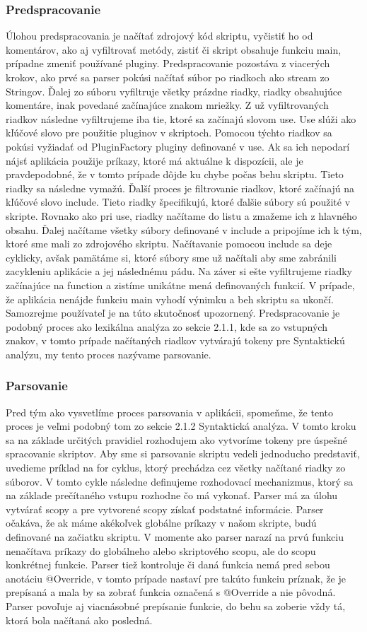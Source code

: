 {\subsubsection{Predspracovanie}
\indent Úlohou predspracovania je načítať zdrojový kód skriptu, vyčistiť ho od komentárov, ako aj vyfiltrovať metódy, zistiť či skript obsahuje funkciu main, prípadne zmeniť používané pluginy. Predspracovanie pozostáva z viacerých krokov, ako prvé sa parser pokúsi načítať súbor po riadkoch ako stream zo Stringov. Ďalej zo súboru vyfiltruje všetky prázdne riadky, riadky obsahujúce komentáre, inak povedané začínajúce znakom mriežky. Z už vyfiltrovaných riadkov následne vyfiltrujeme iba tie, ktoré sa začínajú slovom use. Use slúži ako kľúčové slovo pre použitie pluginov v skriptoch. Pomocou týchto riadkov sa pokúsi vyžiadať od PluginFactory pluginy definované v use. Ak sa ich nepodarí nájsť aplikácia použije príkazy, ktoré má aktuálne k dispozícii, ale je pravdepodobné, že v tomto prípade dôjde ku chybe počas behu skriptu. Tieto riadky sa následne vymažú. Ďalší proces je filtrovanie riadkov, ktoré začínajú na kľúčové slovo include. Tieto riadky špecifikujú, ktoré ďalšie súbory sú použité v skripte. Rovnako ako pri use, riadky načítame do listu a zmažeme ich z hlavného obsahu. Ďalej načítame všetky súbory definované v include a pripojíme ich k tým, ktoré sme mali zo zdrojového skriptu. Načítavanie pomocou include sa deje cyklicky, avšak pamätáme si, ktoré súbory sme už načítali aby sme zabránili zacykleniu aplikácie a jej následnému pádu. Na záver si ešte vyfiltrujeme riadky začínajúce na function a zistíme unikátne mená definovaných funkcií. V prípade, že aplikácia nenájde funkciu main vyhodí výnimku a beh skriptu sa ukončí. Samozrejme používateľ je na túto skutočnosť upozornený. Predspracovanie je podobný proces ako lexikálna analýza zo sekcie 2.1.1, kde sa zo vstupných znakov, v tomto prípade načítaných riadkov vytvárajú tokeny pre Syntaktickú analýzu, my tento proces nazývame parsovanie.
\subsubsection{Parsovanie}
\indent Pred tým ako vysvetlíme proces parsovania v aplikácii, spomeňme, že tento proces je veľmi podobný tom zo sekcie 2.1.2 Syntaktická analýza. V tomto kroku sa na základe určitých pravidiel rozhodujem ako vytvoríme tokeny pre úspešné spracovanie skriptov. Aby sme si parsovanie skriptu vedeli jednoducho predstaviť, uvedieme príklad na for cyklus, ktorý prechádza cez všetky načítané riadky zo súborov. V tomto cykle následne definujeme rozhodovací mechanizmus, ktorý sa na základe prečítaného vstupu rozhodne čo má vykonať. Parser má za úlohu vytvárať scopy a pre vytvorené scopy získať podstatné informácie. Parser očakáva, že ak máme akékoľvek globálne príkazy v našom skripte, budú definované na začiatku skriptu. V momente ako parser narazí na prvú funkciu nenačítava príkazy do globálneho alebo skriptového scopu, ale do scopu konkrétnej funkcie. Parser tiež kontroluje či daná funkcia nemá pred sebou anotáciu @Override, v tomto prípade nastaví pre takúto funkciu príznak, že je prepísaná a mala by sa zobrať funkcia označená s @Override a nie pôvodná. Parser povoľuje aj viacnásobné prepísanie funkcie, do behu sa zoberie vždy tá, ktorá bola načítaná ako posledná. 
}
